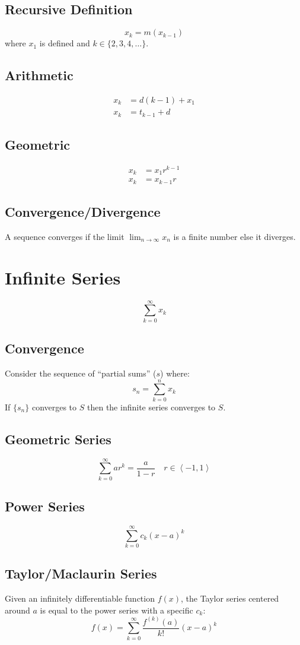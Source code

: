 \documentclass[12pt]{article}
\newcommand*{\rmaskip}{\setlength{\abovedisplayskip}{0pt}}
\newcommand*{\rmbskip}{\setlength{\belowdisplayskip}{0pt}}
\newcommand*{\rmskip}{\rmaskip \rmbskip}
\newcommand*{\isum}[1][k]{\sum_{#1=0}^\infty}
\begin{document}
\subsection*{Recursive Definition}
\[
  x_k = m(x_{k-1})
\]
where \(x_1\) is defined and \(k \in \{2,3,4,\dots\}\).
\subsection*{Arithmetic}
{\rmskip\begin{align*}
  x_k &= d(k-1) + x_1\\
  x_k &= t_{k-1} + d
\end{align*}}%
\subsection*{Geometric}
{\rmskip\begin{align*}
  x_k &= x_1r^{k-1}\\
  x_k &= x_{k-1} r
\end{align*}}%
\subsection*{Convergence\slash Divergence}
A sequence converges if the limit \(\displaystyle\lim_{n \to \infty} x_n\) is
a finite number else it diverges.
\section*{Infinite Series}
\[
  \isum x_k
\]
\subsection*{Convergence}
Consider the sequence of ``partial sums'' (\(s\)) where:
\[
  s_n = \sum_{k=0}^n x_k
\]
If \(\{s_n\}\) converges to \(S\) then the infinite series converges to \(S\).
\subsection*{Geometric Series}
\[
  \isum ar^{k} = \frac{a}{1-r} \quad r \in \left<-1,1\right>
\]
\subsection*{Power Series}
\[
  \isum c_k(x-a)^k
\]
\subsection*{Taylor/Maclaurin Series}
Given an infinitely differentiable function \(f(x)\), the Taylor series
centered around \(a\) is equal to the power series with a specific \(c_k\):
\[
  f(x) = \isum \frac{f^{(k)}(a)}{k!}(x-a)^k
\]
\end{document}

